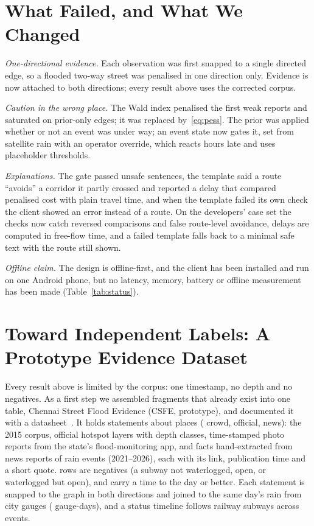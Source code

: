 \documentclass[conference]{IEEEtran}
\begin{document}
\section{What Failed, and What We Changed}\label{sec:lessons}
\emph{One-directional evidence.} Each observation was first snapped to a single directed edge, so a flooded two-way street was penalised in one direction only. Evidence is now attached to both directions; every result above uses the corrected corpus.

\emph{Caution in the wrong place.} The Wald index penalised the first weak reports and saturated on prior-only edges; it was replaced by~\eqref{eq:pess}. The prior was applied whether or not an event was under way; an event state now gates it, set from satellite rain with an operator override, which reacts hours late and uses placeholder thresholds.

\emph{Explanations.} The gate passed unsafe sentences, the template said a route ``avoids'' a corridor it partly crossed and reported a delay that compared penalised cost with plain travel time, and when the template failed its own check the client showed an error instead of a route. On the developers' case set the checks now catch reversed comparisons and false route-level avoidance, delays are computed in free-flow time, and a failed template falls back to a minimal safe text with the route still shown.

\emph{Offline claim.} The design is offline-first, and the client has been installed and run on one Android phone, but no latency, memory, battery or offline measurement has been made (Table~\ref{tab:status}).

\section{Toward Independent Labels: A Prototype Evidence Dataset}\label{sec:csfe}
Every result above is limited by the corpus: one timestamp, no depth and no negatives. As a first step we assembled fragments that
already exist into one table, Chennai Street Flood Evidence (CSFE, prototype), and documented it with a datasheet~\cite{gebru2021datasheets}. It holds \CsfeObs{} statements about places (\CsfeCrowd{} crowd, \CsfeOfficial{} official, \CsfeNews{} news): the 2015 corpus, official hotspot layers with depth classes, time-stamped photo reports from the state's flood-monitoring app, and facts hand-extracted from news reports of \CsfeNewsEvents{} rain events (2021--2026), each with its link, publication time and a short quote. \CsfeNeg{} rows are negatives (a subway not waterlogged, open, or waterlogged but open), and \CsfeTimed{} carry a time to the day or better. Each statement is snapped to the graph in both directions and joined to the same day's rain from \CsfeGauges{} city gauges (\CsfeGaugeDays{} gauge-days), and a status timeline follows \CsfeSubways{} railway subways across events.
\end{document}

